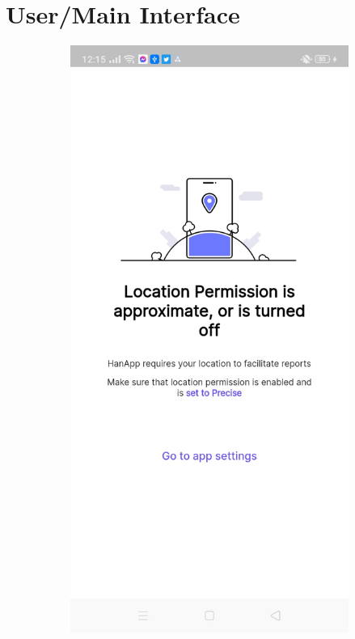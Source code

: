 %
%
%                 

\chapter{User/Main Interface}
\label{sec:appendixa}

\begin{figure}[!h]
    \centering
    \begin{subfigure}[c]{0.30\linewidth}
        \centering
        \includegraphics[scale=0.15]{figures/Chapter4/Main/PermissionOff.jpg}

\end{subfigure}
\end{figure}
